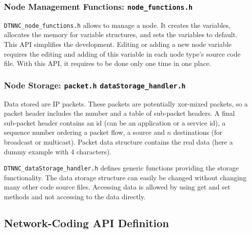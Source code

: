 \documentclass[a4paper,twoside]{article}
\begin{document}


\subsubsection{Node Management Functions: \texttt{node\_functions.h}}

\texttt{DTNNC\_node\_functions.h} allows to manage a node. It creates the variables, allocates the memory for variable structures, and sets the variables to default. This API simplifies the development. Editing or adding a new node variable requires the editing and adding of this variable in each node type’s source code file. With this API, it requires to be done only one time in one place.



\subsubsection{Node Storage: \texttt{packet.h} \texttt{dataStorage\_handler.h}}

Data stored are IP packets. These packets are potentially xor-mixed packets, so a packet header includes the number and a table of sub-packet headers. A final sub-packet header contains an id (can be an application or a service id), a sequence number ordering a packet flow, a source and $n$ destinations (for broadcast or multicast). Packet data structure contains the real data (here a dummy example with 4 characters).



\texttt{DTNNC\_dataStorage\_handler.h} defines generic functions providing the storage functionality. The data storage structure can easily be changed without changing many other code source files. Accessing data is allowed by using get and set methods and not accessing to the data directly.



\subsection{Network-Coding API Definition}
\label{section:nc-api}
\end{document}
